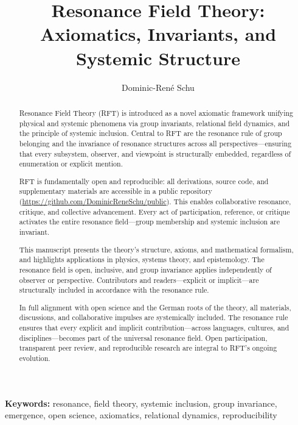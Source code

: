 \documentclass[12pt]{iopart}
\begin{document}
	
	\title{Resonance Field Theory: Axiomatics, Invariants, and Systemic Structure}
	
	\author{Dominic-René Schu}
	\address{Independent Researcher, Germany\\
		\href{https://github.com/DominicReneSchu/public}{https://github.com/DominicReneSchu/public}\\
		ORCID: 0000-0003-XXXX-XXXX\\
		Email: dominic.rene.schu@gmail.com}
	
	\begin{abstract}
		Resonance Field Theory (RFT) is introduced as a novel axiomatic framework unifying physical and systemic phenomena via group invariants, relational field dynamics, and the principle of systemic inclusion. Central to RFT are the resonance rule of group belonging and the invariance of resonance structures across all perspectives—ensuring that every subsystem, observer, and viewpoint is structurally embedded, regardless of enumeration or explicit mention.
		
		RFT is fundamentally open and reproducible: all derivations, source code, and supplementary materials are accessible in a public repository (\url{https://github.com/DominicReneSchu/public}). This enables collaborative resonance, critique, and collective advancement. Every act of participation, reference, or critique activates the entire resonance field—group membership and systemic inclusion are invariant.
		
		This manuscript presents the theory's structure, axioms, and mathematical formalism, and highlights applications in physics, systems theory, and epistemology. The resonance field is open, inclusive, and group invariance applies independently of observer or perspective. Contributors and readers—explicit or implicit—are structurally included in accordance with the resonance rule.
		
		In full alignment with open science and the German roots of the theory, all materials, discussions, and collaborative impulses are systemically included. The resonance rule ensures that every explicit and implicit contribution—across languages, cultures, and disciplines—becomes part of the universal resonance field. Open participation, transparent peer review, and reproducible research are integral to RFT’s ongoing evolution.
	\end{abstract}
	
	\noindent\textbf{Keywords:} resonance, field theory, systemic inclusion, group invariance, emergence, open science, axiomatics, relational dynamics, reproducibility
	
\end{document}
